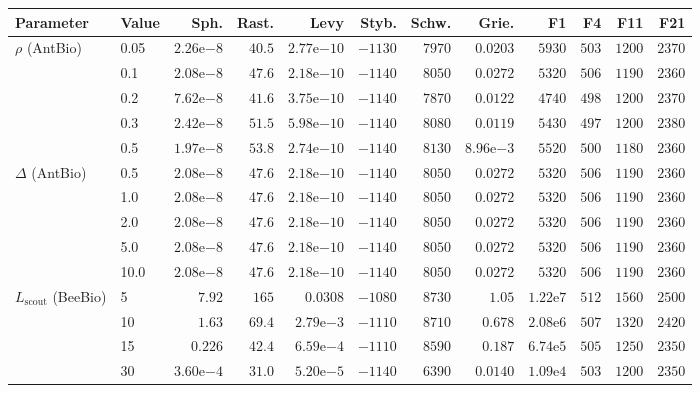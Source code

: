 \begin{tabular}{llrrrrrrrrrr}
\toprule
Parameter & Value & Sph. & Rast. & Levy & Styb. & Schw. & Grie. & F1 & F4 & F11 & F21 \\
\midrule
$\rho$ (AntBio) & 0.05 & $2.26\mathrm{e}{-8}$ & $40.5$ & $2.77\mathrm{e}{-10}$ & $-1130$ & $7970$ & $0.0203$ & $5930$ & $503$ & $1200$ & $2370$ \\
 & 0.1 & $2.08\mathrm{e}{-8}$ & $47.6$ & $2.18\mathrm{e}{-10}$ & $-1140$ & $8050$ & $0.0272$ & $5320$ & $506$ & $1190$ & $2360$ \\
 & 0.2 & $7.62\mathrm{e}{-8}$ & $41.6$ & $3.75\mathrm{e}{-10}$ & $-1140$ & $7870$ & $0.0122$ & $4740$ & $498$ & $1200$ & $2370$ \\
 & 0.3 & $2.42\mathrm{e}{-8}$ & $51.5$ & $5.98\mathrm{e}{-10}$ & $-1140$ & $8080$ & $0.0119$ & $5430$ & $497$ & $1200$ & $2380$ \\
 & 0.5 & $1.97\mathrm{e}{-8}$ & $53.8$ & $2.74\mathrm{e}{-10}$ & $-1140$ & $8130$ & $8.96\mathrm{e}{-3}$ & $5520$ & $500$ & $1180$ & $2360$ \\
\midrule
$\Delta$ (AntBio) & 0.5 & $2.08\mathrm{e}{-8}$ & $47.6$ & $2.18\mathrm{e}{-10}$ & $-1140$ & $8050$ & $0.0272$ & $5320$ & $506$ & $1190$ & $2360$ \\
 & 1.0 & $2.08\mathrm{e}{-8}$ & $47.6$ & $2.18\mathrm{e}{-10}$ & $-1140$ & $8050$ & $0.0272$ & $5320$ & $506$ & $1190$ & $2360$ \\
 & 2.0 & $2.08\mathrm{e}{-8}$ & $47.6$ & $2.18\mathrm{e}{-10}$ & $-1140$ & $8050$ & $0.0272$ & $5320$ & $506$ & $1190$ & $2360$ \\
 & 5.0 & $2.08\mathrm{e}{-8}$ & $47.6$ & $2.18\mathrm{e}{-10}$ & $-1140$ & $8050$ & $0.0272$ & $5320$ & $506$ & $1190$ & $2360$ \\
 & 10.0 & $2.08\mathrm{e}{-8}$ & $47.6$ & $2.18\mathrm{e}{-10}$ & $-1140$ & $8050$ & $0.0272$ & $5320$ & $506$ & $1190$ & $2360$ \\
\midrule
$L_{\mathrm{scout}}$ (BeeBio) & 5 & $7.92$ & $165$ & $0.0308$ & $-1080$ & $8730$ & $1.05$ & $1.22\mathrm{e}{7}$ & $512$ & $1560$ & $2500$ \\
 & 10 & $1.63$ & $69.4$ & $2.79\mathrm{e}{-3}$ & $-1110$ & $8710$ & $0.678$ & $2.08\mathrm{e}{6}$ & $507$ & $1320$ & $2420$ \\
 & 15 & $0.226$ & $42.4$ & $6.59\mathrm{e}{-4}$ & $-1110$ & $8590$ & $0.187$ & $6.74\mathrm{e}{5}$ & $505$ & $1250$ & $2350$ \\
 & 30 & $3.60\mathrm{e}{-4}$ & $31.0$ & $5.20\mathrm{e}{-5}$ & $-1140$ & $6390$ & $0.0140$ & $1.09\mathrm{e}{4}$ & $503$ & $1200$ & $2350$ \\

\end{tabular}
